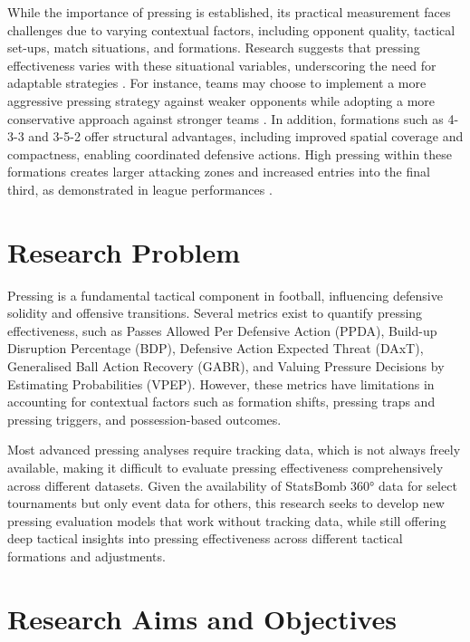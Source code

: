 While the importance of pressing is established, its practical measurement faces challenges due to varying contextual factors, including opponent quality, tactical set-ups, match situations, and formations. Research suggests that pressing effectiveness varies with these situational variables, underscoring the need for adaptable strategies \citep{ruan_quantifying_2022, toda_evaluation_2022}. For instance, teams may choose to implement a more aggressive pressing strategy against weaker opponents while adopting a more conservative approach against stronger teams \citep{bauer_putting_2023, forcher_leander_is_2024}. In addition, formations such as 4-3-3 and 3-5-2 offer structural advantages, including improved spatial coverage and compactness, enabling coordinated defensive actions. High pressing within these formations creates larger attacking zones and increased entries into the final third, as demonstrated in league performances \citep{brindescu_study_2021, scotognella_simulations_2021}.

\section{Research Problem}

Pressing is a fundamental tactical component in football, influencing defensive solidity and offensive transitions. Several metrics exist to quantify pressing effectiveness, such as Passes Allowed Per Defensive Action (PPDA), Build-up Disruption Percentage (BDP), Defensive Action Expected Threat (DAxT), Generalised Ball Action Recovery (GABR), and Valuing Pressure Decisions by Estimating Probabilities (VPEP). However, these metrics have limitations in accounting for contextual factors such as formation shifts, pressing traps and pressing triggers, and possession-based outcomes.

Most advanced pressing analyses require tracking data, which is not always freely available, making it difficult to evaluate pressing effectiveness comprehensively across different datasets. Given the availability of StatsBomb 360° data for select tournaments but only event data for others, this research seeks to develop new pressing evaluation models that work without tracking data, while still offering deep tactical insights into pressing effectiveness across different tactical formations and adjustments.

\section{Research Aims and Objectives}

